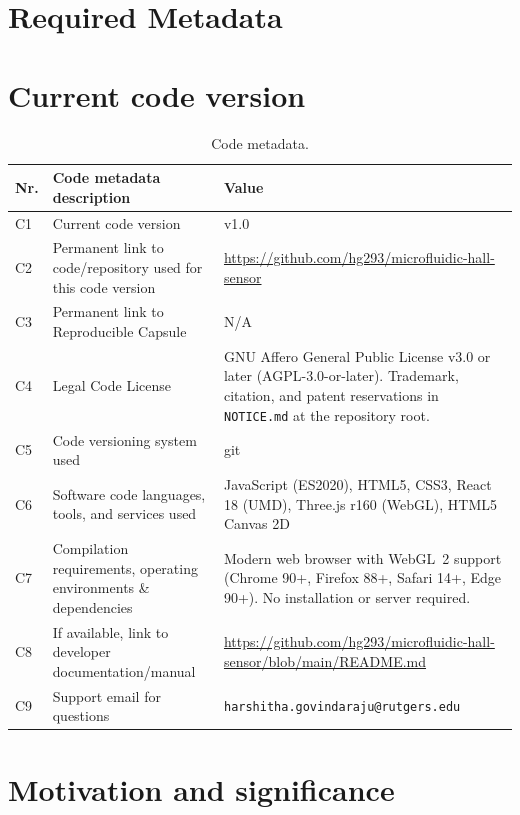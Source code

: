 \documentclass[preprint,12pt,a4paper]{elsarticle}
\begin{document}
\section*{Required Metadata}
\section*{Current code version}

\begin{table}[!h]
\centering
\footnotesize
\begin{tabular}{|l|p{6.0cm}|p{6.0cm}|}
\hline
\textbf{Nr.} & \textbf{Code metadata description} & \textbf{Value} \\
\hline
C1 & Current code version & v1.0 \\
\hline
C2 & Permanent link to code/repository used for this code version & \url{https://github.com/hg293/microfluidic-hall-sensor} \\
\hline
C3 & Permanent link to Reproducible Capsule & N/A \\
\hline
C4 & Legal Code License & GNU Affero General Public License v3.0 or later (AGPL-3.0-or-later). Trademark, citation, and patent reservations in \texttt{NOTICE.md} at the repository root. \\
\hline
C5 & Code versioning system used & git \\
\hline
C6 & Software code languages, tools, and services used & JavaScript (ES2020), HTML5, CSS3, React 18 (UMD), Three.js r160 (WebGL), HTML5 Canvas 2D \\
\hline
C7 & Compilation requirements, operating environments \& dependencies & Modern web browser with WebGL~2 support (Chrome 90+, Firefox 88+, Safari 14+, Edge 90+). No installation or server required. \\
\hline
C8 & If available, link to developer documentation/manual & \url{https://github.com/hg293/microfluidic-hall-sensor/blob/main/README.md} \\
\hline
C9 & Support email for questions & \texttt{harshitha.govindaraju@rutgers.edu} \\
\hline
\end{tabular}
\caption{Code metadata.}
\label{tab:codemeta}
\end{table}

\section{Motivation and significance}
\end{document}
